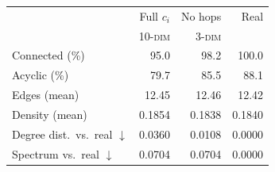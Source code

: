 \begin{tabular}{lrrr}
\toprule
 & Full $c_i$ & No hops & Real \\
 & \textsc{10-dim} & \textsc{3-dim} & \\
\midrule
Connected (\%) & 95.0 & 98.2 & 100.0 \\
Acyclic (\%) & 79.7 & 85.5 & 88.1 \\
Edges (mean) & 12.45 & 12.46 & 12.42 \\
Density (mean) & 0.1854 & 0.1838 & 0.1840 \\
\midrule
Degree dist.\ vs.\ real $\downarrow$ & 0.0360 & 0.0108 & 0.0000 \\
Spectrum vs.\ real $\downarrow$ & 0.0704 & 0.0704 & 0.0000 \\
\bottomrule
\end{tabular}

